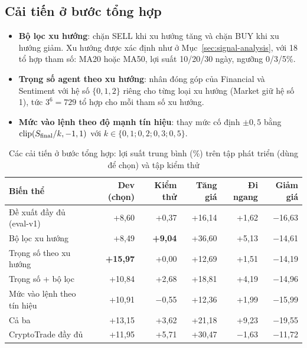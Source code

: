 \subsection{Cải tiến ở bước tổng hợp}
\begin{itemize}
  \item \textbf{Bộ lọc xu hướng}: chặn SELL khi xu hướng tăng và chặn BUY khi xu hướng giảm. Xu hướng được xác định như
  ở Mục~\ref{sec:signal-analysis}, với 18 tổ hợp tham số: MA20 hoặc MA50, lợi suất 10/20/30 ngày, ngưỡng 0/3/5\%.
  \item \textbf{Trọng số agent theo xu hướng}: nhân đóng góp của Financial và Sentiment với hệ số $\{0, 1, 2\}$ riêng
  cho từng loại xu hướng (Market giữ hệ số 1), tức $3^6=729$ tổ hợp cho mỗi tham số xu hướng.
  \item \textbf{Mức vào lệnh theo độ mạnh tín hiệu}: thay mức cố định $\pm0{,}5$ bằng
  $\mathrm{clip}(S_{\text{final}}/k,-1,1)$ với $k\in\{0{,}1;0{,}2;0{,}3;0{,}5\}$.
\end{itemize}

\begin{table}[H]
\centering
\caption{Các cải tiến ở bước tổng hợp: lợi suất trung bình (\%) trên tập phát triển (dùng để chọn) và tập kiểm thử}
\label{tab:offline-variants}
\small
\begin{tabular}{lrrrrr}
\toprule
Biến thể & Dev (chọn) & Kiểm thử & Tăng giá & Đi ngang & Giảm giá \\
\midrule
Đề xuất đầy đủ (eval-v1) & +8,60 & +0,37 & +16,14 & +1,62 & $-$16,63 \\
Bộ lọc xu hướng & +8,49 & \textbf{+9,04} & +36,60 & +5,13 & $-$14,61 \\
Trọng số theo xu hướng & \textbf{+15,97} & +0,00 & +12,69 & +1,51 & $-$14,19 \\
Trọng số + bộ lọc & +10,84 & +2,68 & +18,81 & +4,19 & $-$14,96 \\
Mức vào lệnh theo tín hiệu & +10,91 & $-$0,55 & +12,36 & +1,99 & $-$15,99 \\
Cả ba & +13,15 & +3,62 & +21,18 & +9,23 & $-$19,55 \\
\midrule
CryptoTrade đầy đủ & +11,95 & +5,71 & +30,47 & $-$1,63 & $-$11,72 \\
\bottomrule
\end{tabular}
\end{table}

